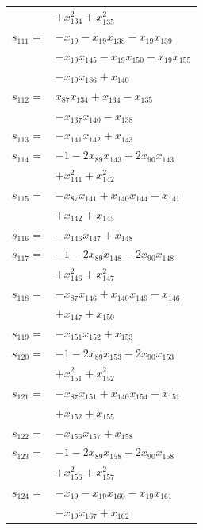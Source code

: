 \begin{longtable}{@{}r@{\;}l@{}}
 & \(\displaystyle +x_{134}^{2} +x_{135}^{2}\) \\[3pt]
\(s_{111}=\) & \(\displaystyle -x_{19} -x_{19}x_{138} -x_{19}x_{139}\) \\
 & \(\displaystyle -x_{19}x_{145} -x_{19}x_{150} -x_{19}x_{155}\) \\
 & \(\displaystyle -x_{19}x_{186} +x_{140}\) \\[3pt]
\(s_{112}=\) & \(\displaystyle x_{87}x_{134} +x_{134} -x_{135}\) \\
 & \(\displaystyle -x_{137}x_{140} -x_{138}\) \\[3pt]
\(s_{113}=\) & \(\displaystyle -x_{141}x_{142} +x_{143}\) \\[3pt]
\(s_{114}=\) & \(\displaystyle -1 -2x_{89}x_{143} -2x_{90}x_{143}\) \\
 & \(\displaystyle +x_{141}^{2} +x_{142}^{2}\) \\[3pt]
\(s_{115}=\) & \(\displaystyle -x_{87}x_{141} +x_{140}x_{144} -x_{141}\) \\
 & \(\displaystyle +x_{142} +x_{145}\) \\[3pt]
\(s_{116}=\) & \(\displaystyle -x_{146}x_{147} +x_{148}\) \\[3pt]
\(s_{117}=\) & \(\displaystyle -1 -2x_{89}x_{148} -2x_{90}x_{148}\) \\
 & \(\displaystyle +x_{146}^{2} +x_{147}^{2}\) \\[3pt]
\(s_{118}=\) & \(\displaystyle -x_{87}x_{146} +x_{140}x_{149} -x_{146}\) \\
 & \(\displaystyle +x_{147} +x_{150}\) \\[3pt]
\(s_{119}=\) & \(\displaystyle -x_{151}x_{152} +x_{153}\) \\[3pt]
\(s_{120}=\) & \(\displaystyle -1 -2x_{89}x_{153} -2x_{90}x_{153}\) \\
 & \(\displaystyle +x_{151}^{2} +x_{152}^{2}\) \\[3pt]
\(s_{121}=\) & \(\displaystyle -x_{87}x_{151} +x_{140}x_{154} -x_{151}\) \\
 & \(\displaystyle +x_{152} +x_{155}\) \\[3pt]
\(s_{122}=\) & \(\displaystyle -x_{156}x_{157} +x_{158}\) \\[3pt]
\(s_{123}=\) & \(\displaystyle -1 -2x_{89}x_{158} -2x_{90}x_{158}\) \\
 & \(\displaystyle +x_{156}^{2} +x_{157}^{2}\) \\[3pt]
\(s_{124}=\) & \(\displaystyle -x_{19} -x_{19}x_{160} -x_{19}x_{161}\) \\
 & \(\displaystyle -x_{19}x_{167} +x_{162}\) \\[3pt]

\end{longtable}
